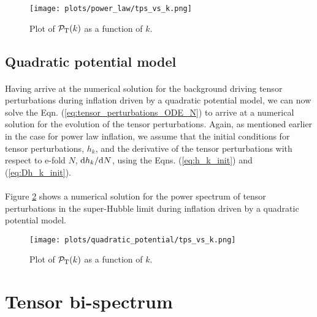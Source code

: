 \documentclass[12pt,a4paper,oneside]{book}
\begin{document}
\begin{figure}
\begin{center}
\texttt{[image: plots/power\_law/tps\_vs\_k.png]}
\caption[Plot of $\mathcal{P}_{\rm T}(k)$ as a function of $k$ in power law inflation.]
{Plot of $\mathcal{P}_{\rm T}(k)$ as a function of $k$.}
\label{tps_p}
\end{center}
\end{figure}

\subsection{Quadratic potential model}

\paragraph*{} Having arrive at the numerical solution for the background driving tensor 
perturbations during inflation driven by a quadratic potential model, we can now solve 
the Eqn. (\ref{eq:tensor_perturbations_ODE_N}) to arrive at a numerical solution for the 
evolution of the tensor perturbations. Again, as mentioned earlier in the case for power law 
inflation, we assume that the initial conditions for tensor perturbations, $h_k$,  and the 
derivative of the tensor perturbations with respect to e-fold $N$, ${\rm d}h_k/{\rm d}N$, 
using the Eqns. (\ref{eq:h_k_init}) and (\ref{eq:Dh_k_init}).

\paragraph*{} Figure \ref{tps_p_quad} shows a numerical solution for the 
power spectrum of tensor perturbations in the super-Hubble limit during inflation 
driven by a quadratic potential model.

\begin{figure}
\begin{center}
\texttt{[image: plots/quadratic\_potential/tps\_vs\_k.png]}
\caption[Plot of $\mathcal{P}_{\rm T}(k)$ as a function of $k$ in quadratic potential model.]
{Plot of $\mathcal{P}_{\rm T}(k)$ as a function of $k$.}
\label{tps_p_quad}
\end{center}
\end{figure}

\section{Tensor bi-spectrum}
\end{document}
